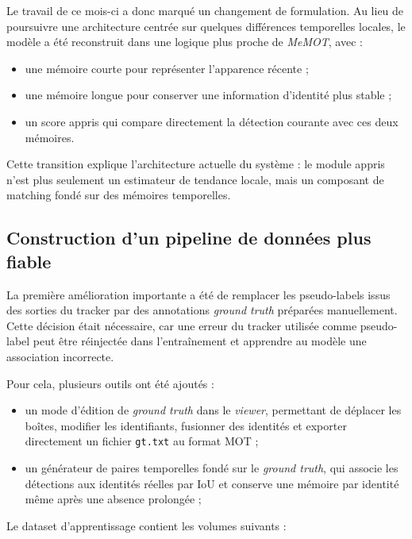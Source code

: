 \documentclass[11pt,a4paper]{article}
\begin{document}
Le travail de ce mois-ci a donc marqué un changement de formulation. Au lieu de poursuivre une architecture centrée sur quelques différences temporelles locales, le modèle a été reconstruit dans une logique plus proche de \textit{MeMOT}, avec :
\begin{itemize}
    \item une mémoire courte pour représenter l'apparence récente ;
    \item une mémoire longue pour conserver une information d'identité plus stable ;
    \item un score appris qui compare directement la détection courante avec ces deux mémoires.
\end{itemize}

Cette transition explique l'architecture actuelle du système : le module appris n'est plus seulement un estimateur de tendance locale, mais un composant de matching fondé sur des mémoires temporelles.

\subsection{Construction d'un pipeline de données plus fiable}

La première amélioration importante a été de remplacer les pseudo-labels issus des sorties du tracker par des annotations \textit{ground truth} préparées manuellement. Cette décision était nécessaire, car une erreur du tracker utilisée comme pseudo-label peut être réinjectée dans l'entraînement et apprendre au modèle une association incorrecte.

Pour cela, plusieurs outils ont été ajoutés :
\begin{itemize}
    \item un mode d'édition de \textit{ground truth} dans le \textit{viewer}, permettant de déplacer les boîtes, modifier les identifiants, fusionner des identités et exporter directement un fichier \texttt{gt.txt} au format MOT ;
    \item un générateur de paires temporelles fondé sur le \textit{ground truth}, qui associe les détections aux identités réelles par IoU et conserve une mémoire par identité même après une absence prolongée ;
\end{itemize}

Le dataset d'apprentissage contient les volumes suivants :
\end{document}
